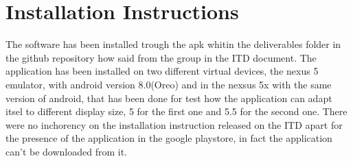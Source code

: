 \chapter{Installation Instructions}
The software has been installed trough the apk whitin the deliverables folder in the github repository how said from the group in the ITD document. The application has been installed on two different virtual devices, the nexus 5 emulator, with android version 8.0(Oreo) and in the nexsus 5x with the same version of android, that has been done for test how the application can adapt itsel to different display size, 5 for the first one and 5.5 for the second one. There were no inchorency on the installation instruction released on the ITD apart for the presence of the application in the google playstore, in fact the application can't be downloaded from it.